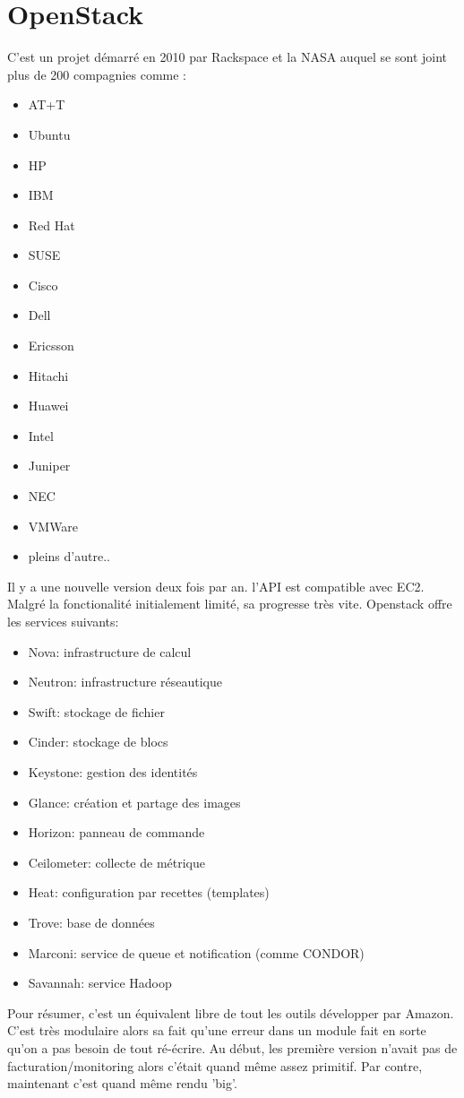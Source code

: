 \documentclass[oneside]{book}
\begin{document}
\section{OpenStack}
C'est un projet démarré en 2010 par Rackspace et la NASA auquel se sont joint plus de 200 compagnies comme :
\begin{itemize}
\item AT+T
\item Ubuntu
\item HP
\item IBM
\item Red Hat
\item SUSE
\item Cisco
\item Dell
\item Ericsson
\item Hitachi
\item Huawei
\item Intel
\item Juniper
\item NEC
\item VMWare
\item pleins d'autre..
\end{itemize}  

Il y a une nouvelle version deux fois par an. l'API est compatible avec EC2. Malgré la fonctionalité initialement limité, sa progresse très vite. Openstack offre les services suivants:
\begin{itemize}
\item Nova: infrastructure de calcul
\item Neutron: infrastructure réseautique
\item Swift: stockage de fichier
\item Cinder: stockage de blocs
\item Keystone: gestion des identités
\item Glance: création et partage des images
\item Horizon: panneau de commande
\item Ceilometer: collecte de métrique
\item Heat: configuration par recettes (templates)
\item Trove: base de données
\item Marconi: service de queue et notification (comme CONDOR)
\item Savannah: service Hadoop
\end{itemize}

Pour résumer, c'est un équivalent libre de tout les outils développer par Amazon. C'est très modulaire alors sa fait qu'une erreur dans un module fait en sorte qu'on a pas besoin de tout ré-écrire. Au début, les première version n'avait pas de facturation/monitoring alors c'était quand même assez primitif. Par contre, maintenant c'est quand même rendu 'big'.
\end{document}
